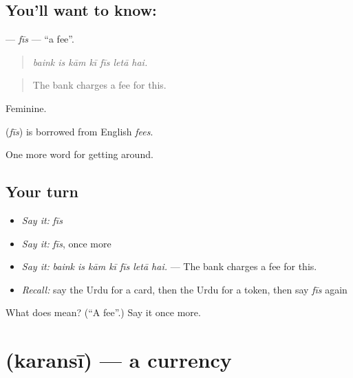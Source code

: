 \subsection*{You'll want to know: }
\textbf{} — \emph{fīs} — \textquotedblleft{}a fee\textquotedblright{}.

\begin{quote}
      
\end{quote}

\begin{quote}
\emph{baink is kām kī fīs letā hai.}
\end{quote}

\begin{quote}
The bank charges a fee for this.
\end{quote}

Feminine.

\begin{cousinweb}
\textbf{} (\emph{fīs}) is borrowed from English \emph{fees}.
\end{cousinweb}

\begin{grammarlens}[title={What you've built}]
One more word for getting around.
\end{grammarlens}

\subsection*{Your turn}
\begin{itemize}
\raggedright
  \item \emph{Say it:} \emph{fīs}
  \item \emph{Say it:} \emph{fīs}, once more
  \item \emph{Say it:} \emph{baink is kām kī fīs letā hai.} — The bank charges a fee for this.
  \item \emph{Recall:} say the Urdu for a card, then the Urdu for a token, then say \emph{fīs} again
\end{itemize}

\begin{tcolorbox}[breakable,colback=teal!4,colframe=teal!35!black,title={Before you move on}]
What does  mean? (\textquotedblleft{}A fee\textquotedblright{}.) Say it once more.
\end{tcolorbox}
\section[\texorpdfstring{\ur{کرنسی} (karansī)}{کرنسی (karansī)}]{ (karansī) — a currency}


